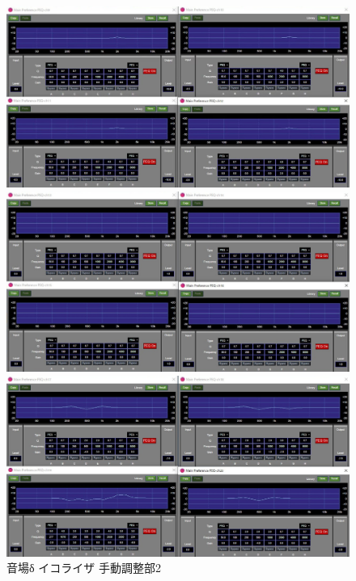 \documentclass[11pt,a4j]{jreport}
\begin{document}
\begin{figure}[H]
  \begin{minipage}[b]{.5\linewidth}
    \centering
    \includegraphics[width=.9\linewidth]{images/experimentField/afcParameters/04delta/05manualEQ8.jpg}
  \end{minipage}%
  \begin{minipage}[b]{.5\linewidth}
    \centering
    \includegraphics[width=.9\linewidth]{images/experimentField/afcParameters/04delta/05manualEQ9.jpg}
  \end{minipage}

  \begin{minipage}[b]{1\linewidth}
    \centering
    \includegraphics[width=.45\linewidth]{images/experimentField/afcParameters/04delta/05manualEQ10.jpg}
  \end{minipage}

  \centering
  \caption{音場δ イコライザ 手動調整部2}
  \label{fig:deltaイコライザ手動調整部2}
\end{figure}


\clearpage


\end{document}
